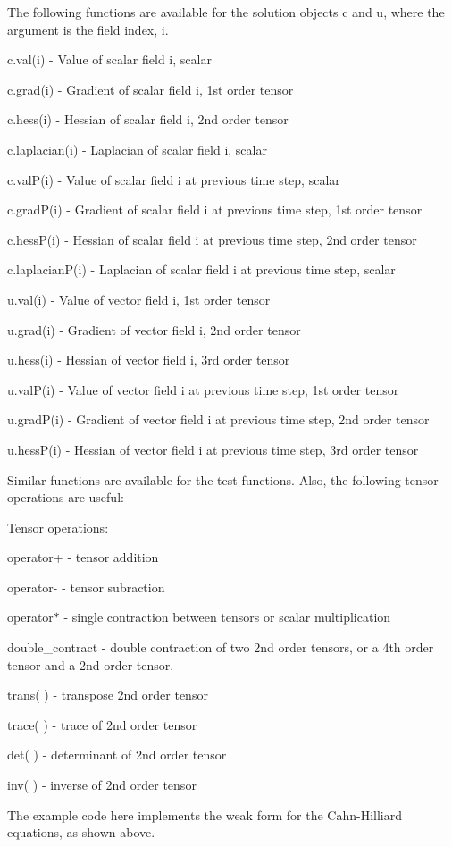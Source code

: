 The following functions are available for the solution objects {\ttfamily c} and {\ttfamily u}, where the argument is the field index, i.

{\ttfamily c.\-val(i)} -\/ Value of scalar field i, scalar \par
{\ttfamily c.\-grad(i)} -\/ Gradient of scalar field i, 1st order tensor \par
{\ttfamily c.\-hess(i)} -\/ Hessian of scalar field i, 2nd order tensor \par
{\ttfamily c.\-laplacian(i)} -\/ Laplacian of scalar field i, scalar \par
{\ttfamily c.\-val\-P(i)} -\/ Value of scalar field i at previous time step, scalar \par
{\ttfamily c.\-grad\-P(i)} -\/ Gradient of scalar field i at previous time step, 1st order tensor \par
{\ttfamily c.\-hess\-P(i)} -\/ Hessian of scalar field i at previous time step, 2nd order tensor \par
{\ttfamily c.\-laplacian\-P(i)} -\/ Laplacian of scalar field i at previous time step, scalar

{\ttfamily u.\-val(i)} -\/ Value of vector field i, 1st order tensor \par
{\ttfamily u.\-grad(i)} -\/ Gradient of vector field i, 2nd order tensor \par
{\ttfamily u.\-hess(i)} -\/ Hessian of vector field i, 3rd order tensor \par
{\ttfamily u.\-val\-P(i)} -\/ Value of vector field i at previous time step, 1st order tensor \par
{\ttfamily u.\-grad\-P(i)} -\/ Gradient of vector field i at previous time step, 2nd order tensor \par
{\ttfamily u.\-hess\-P(i)} -\/ Hessian of vector field i at previous time step, 3rd order tensor

Similar functions are available for the test functions. Also, the following tensor operations are useful\-:

Tensor operations\-: \par
{\ttfamily operator+} -\/ tensor addition \par
{\ttfamily operator-\/} -\/ tensor subraction \par
{\ttfamily operator$\ast$} -\/ single contraction between tensors or scalar multiplication \par
{\ttfamily double\-\_\-contract} -\/ double contraction of two 2nd order tensors, or a 4th order tensor and a 2nd order tensor. \par
{\ttfamily trans( )} -\/ transpose 2nd order tensor \par
{\ttfamily trace( )} -\/ trace of 2nd order tensor \par
{\ttfamily det( )} -\/ determinant of 2nd order tensor \par
{\ttfamily inv( )} -\/ inverse of 2nd order tensor \par
 The example code here implements the weak form for the Cahn-\/\-Hilliard equations, as shown above.

